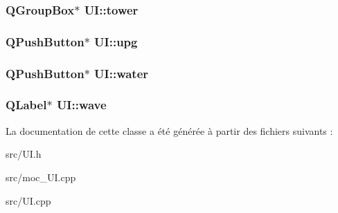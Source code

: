 \label{classUI_a46e8137a64e79962e0ba633d4feb341f}
\hypertarget{classUI_a352f80a494c8d3c1723f1248438ea912}{
\subsubsection[{tower}]{\setlength{\rightskip}{0pt plus 5cm}QGroupBox$\ast$ {\bf UI::tower}}}
\label{classUI_a352f80a494c8d3c1723f1248438ea912}
\hypertarget{classUI_abf5a7181f1e80c8873cfae97be8e8b4f}{
\subsubsection[{upg}]{\setlength{\rightskip}{0pt plus 5cm}QPushButton$\ast$ {\bf UI::upg}}}
\label{classUI_abf5a7181f1e80c8873cfae97be8e8b4f}
\hypertarget{classUI_aaa5e1351929c7da7d4ae82ddbc31c77b}{
\subsubsection[{water}]{\setlength{\rightskip}{0pt plus 5cm}QPushButton$\ast$ {\bf UI::water}}}
\label{classUI_aaa5e1351929c7da7d4ae82ddbc31c77b}
\hypertarget{classUI_a3f735d7d737b15dad131baf43b58eb17}{
\subsubsection[{wave}]{\setlength{\rightskip}{0pt plus 5cm}QLabel$\ast$ {\bf UI::wave}}}
\label{classUI_a3f735d7d737b15dad131baf43b58eb17}


La documentation de cette classe a été générée à partir des fichiers suivants :\begin{DoxyCompactItemize}
\item 
src/UI.h\item 
src/moc\_\-UI.cpp\item 
src/UI.cpp\end{DoxyCompactItemize}
